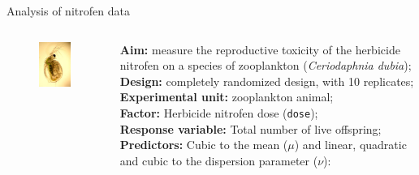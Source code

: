 \documentclass[11pt]{beamer}\usepackage[]{graphicx}\usepackage[]{color}
\begin{document}
\begin{frame}{Analysis of nitrofen data}
  \begin{columns}
    \begin{column}{0.35\textwidth}
      \begin{figure}
        \includegraphics[width=4cm]{./figure2/zooplankton}
      \end{figure}
      \vspace{0.2cm}
    \end{column}
    \begin{column}{0.65\textwidth}
      {\bf Aim:} measure the reproductive toxicity of the herbicide
      nitrofen on a species of zooplankton
      (\textit{Ceriodaphnia dubia});\\[0.2cm]
      {\bf Design:} completely randomized design, with 10
      replicates;\\[0.2cm]
      {\bf Experimental unit:} zooplankton animal;\\[0.2cm]
      {\bf Factor:} Herbicide nitrofen dose (\texttt{dose});\\[0.2cm]
      {\bf Response variable:} Total number of live offspring;\\[0.2cm]
      {\bf Predictors:}
      Cubic to the mean ($\mu$) and linear, quadratic
        and cubic to the dispersion parameter ($\nu$):
    \end{column}
  \end{columns}
\end{frame}
\end{document}

